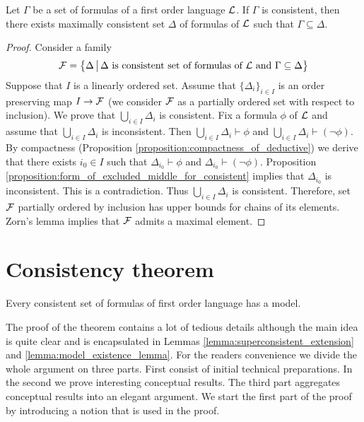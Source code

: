 \begin{proposition}\label{proposition:Lindenbaum_lemma}
Let $\Gamma$ be a set of formulas of a first order language ${\mathcal L}$. If $\Gamma$ is consistent, then there exists maximally consistent set $\Delta$ of formulas of ${\mathcal L}$ such that $\Gamma \subseteq \Delta$.
\end{proposition}
\begin{proof}
Consider a family
$${\mathcal F} = \big\{\Delta \,\big|\,\Delta\mbox{ is consistent set of formulas of }{\mathcal L}\mbox{ and }\Gamma \subseteq \Delta \big\}$$
Suppose that $I$ is a linearly ordered set. Assume that $\{\Delta_i\}_{i\in I}$ is an order preserving map $I \rightarrow {\mathcal F}$ (we consider ${\mathcal F}$ as a partially ordered set with respect to inclusion). We prove that $\bigcup_{i\in I}\Delta_i$ is consistent. Fix a formula $\phi$ of ${\mathcal L}$ and assume that $\bigcup_{i\in I}\Delta_i$ is inconsistent. Then $\bigcup_{i\in I}\Delta_i\vdash \phi$ and $\bigcup_{i\in I}\Delta_i\vdash (\neg \phi)$. By compactness (Proposition \ref{proposition:compactness_of_deductive}) we derive that there exists $i_0\in I$ such that $\Delta_{i_0} \vdash \phi$ and $\Delta_{i_0} \vdash (\neg \phi)$. Proposition \ref{proposition:form_of_excluded_middle_for_consistent} implies that $\Delta_{i_0}$ is inconsistent. This is a contradiction. Thus $\bigcup_{i\in I}\Delta_i$ is consistent. Therefore, set ${\mathcal F}$ partially ordered by inclusion has upper bounds for chains of its elements. Zorn’s lemma implies that ${\mathcal F}$ admits a maximal element.
\end{proof}

\section{Consistency theorem}

\begin{theorem}\label{theorem:consistency_theorem}
Every consistent set of formulas of first order language
has a model.
\end{theorem}
\noindent
The proof of the theorem contains a lot of tedious details although the main idea is quite clear
and is encapsulated in Lemmas \ref{lemma:superconsistent_extension} and \ref{lemma:model_existence_lemma}. For the readers convenience we divide the whole argument
on three parts. First consist of initial technical preparations. In the second we prove interesting
conceptual results. The third part aggregates conceptual results into an elegant argument.
We start the first part of the proof by introducing a notion that is used in the proof.


